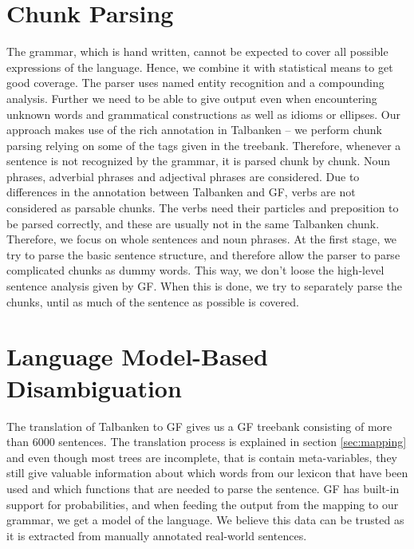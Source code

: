 \documentclass[runningheads,a4paper]{llncs}
\begin{document}
\section{Chunk Parsing}
\label{sec:chunk}
The grammar, which is hand written, cannot be expected to cover all
possible expressions of the language.
Hence, we combine it with statistical means to get good coverage. 
The parser uses named entity recognition and a compounding analysis.
Further we need to be able to give output
even when encountering unknown words and grammatical constructions 
as well as idioms or ellipses.
Our approach makes use of the rich annotation in Talbanken -- we perform chunk parsing
relying on some of the tags given in the treebank. 
Therefore, whenever a sentence is not recognized by the grammar, it is 
parsed chunk by chunk.
Noun phrases, adverbial phrases and adjectival phrases are considered. Due to 
differences in the annotation between Talbanken and GF, verbs are not considered
as parsable chunks. The verbs need their particles and preposition to be parsed
correctly, and these are usually not in the same Talbanken chunk. Therefore,
we focus on whole sentences and noun phrases. At the first stage,
we try to parse the basic sentence structure, and therefore allow the parser
to parse complicated chunks as dummy words. This way, we don't loose the 
high-level sentence analysis given by GF.
When this is done, we try to separately parse the chunks,
until as much of the sentence as possible is covered. 



\section{Language Model-Based Disambiguation}

The translation of Talbanken to GF gives us a GF treebank consisting of more than
6000 sentences. The translation process is explained in section
\ref{sec:mapping} and even though most trees are incomplete, that is contain
meta-variables, they still give valuable 
information about which words from our lexicon that have been used
and which functions that are needed to parse the sentence.
GF has built-in support for probabilities, and when feeding the output
from the mapping to our grammar, we get a model of the language. We believe
this data can be trusted as it is extracted from manually annotated 
real-world sentences.
\end{document}
